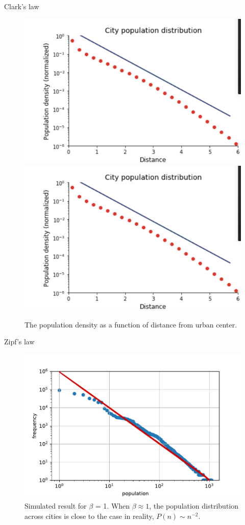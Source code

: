 \documentclass{beamer}
\begin{document}
\begin{frame}{Clark's law}
  \begin{figure}
    \includegraphics[width = 0.8\linewidth]{pics/clark.PNG}
    \includegraphics[width = 0.8\linewidth]{pics/clark.png}
    \caption{The population density as a function of distance from urban center.}
  \end{figure}
\end{frame}

\begin{frame}{Zipf's law }

  \begin{figure}
    \includegraphics[width = 0.8\linewidth]{pics/zipf.pdf}
    \caption{Simulated result for $\beta$ = 1. When $\beta\approx 1$, the population distribution across cities is close to the case in reality, $P(n)\sim n^{-2}$.}
  \end{figure}

\end{frame}
\end{document}
